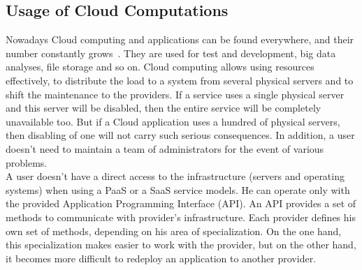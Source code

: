 \subsection*{Usage of Cloud Computations}
Nowadays Cloud computing and applications can be found everywhere, and their number constantly grows~\cite*{cloud_stat}.
They are used for test and development, big data analyses, file storage and so on.
Cloud computing allows using resources effectively, to distribute the load to a system from several physical servers and to shift the maintenance to the providers. 
If  a service uses a single physical server and this server will be disabled, then the entire service will be completely unavailable too.
But if a Cloud application uses a hundred of physical servers, then disabling of one will not carry such serious consequences.
In addition, a user doesn't need to maintain a team of administrators for the event of various problems.\\
A user doesn't have a direct access to the infrastructure (servers and operating systems) when using a PaaS or a SaaS service models. He can operate only with the provided Application Programming Interface (API).
An API provides a set of methods to communicate with provider's infrastructure. 
Each provider defines his own set of methods, depending on his area of specialization. 
On the one hand, this specialization makes easier to work with the provider, but on the other hand, it becomes more difficult to redeploy an application to another provider.
